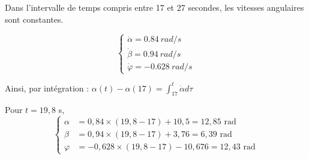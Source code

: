 \ifprof
\begin{corrige}

Dans l'intervalle de temps compris entre 17 et 27 secondes, les vitesses angulaires sont constantes.

$$
\left\{
\begin{array}{l}
{\dot\alpha}{=\SI{0,84}{rad/s}}\\
{\dot\beta}{=\SI{0,94}{rad/s}}\\
{\dot\varphi}{=-\SI{0,628}{rad/s}}
\end{array}
\right.
$$

Ainsi, par intégration :
$\alpha (t)-\alpha(17)=\int_{17}^t \dot\alpha d\tau $

\end{corrige}\else\fi

\ifprof
\begin{corrige}

Pour $t=19,8$ s,
$$
\left\{
\begin{array}{ll}
\alpha&=0,84 \times (19,8-17) + 10,5=\boxed{12,85\text{ rad}}\\
\beta&=0,94\times (19,8-17) +3,76 = \boxed{6,39\text{ rad}}\\
\varphi &= -0,628\times (19,8-17) -10,676 =\boxed{12,43\text{ rad}}
\end{array}
\right.$$
\end{corrige}\else\fi

